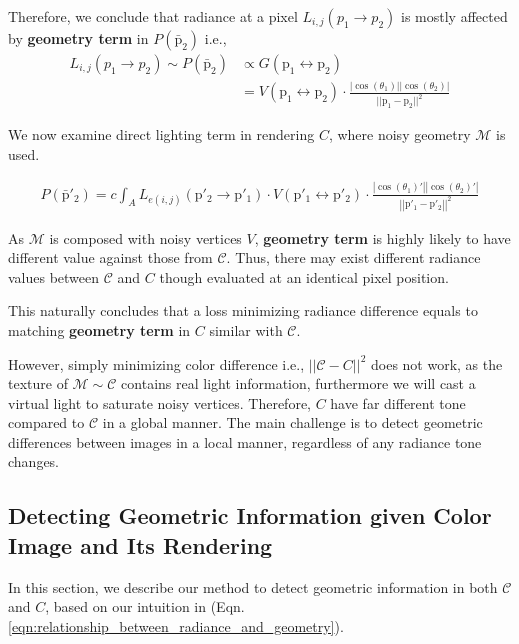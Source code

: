 Therefore, we conclude that radiance at a pixel $L_{i,j}(p_1 \rightarrow p_2)$ is mostly affected by \textbf{geometry term} in $\mathit{P}(\bar{\mathrm{p}}_2)$ i.e., 
\begin{align}
    L_{i,j}(p_1 \rightarrow p_2) \sim \mathit{P}(\bar{\mathrm{p}}_2) & \propto G(\mathrm{p}_1 \leftrightarrow \mathrm{p}_2) \nonumber \\
    & =V(\mathrm{p}_1 \leftrightarrow \mathrm{p}_2) \cdot \frac{|\cos(\theta_1)||\cos(\theta_2)|}{||\mathrm{p}_1-\mathrm{p}_2||^2}
    \label{eqn:relationship_between_radiance_and_geometry}
\end{align}

We now examine direct lighting term in rendering $C$, where noisy geometry $\mathcal{M}$ is used.

\begin{align}
    \mathit{P}\left(\bar{\mathrm{p}}'_2\right) = c\int_A L_{e(i,j)}(\mathrm{p}'_2\rightarrow \mathrm{p}'_1) \cdot V(\mathrm{p}'_1 \leftrightarrow \mathrm{p}'_2) \cdot \frac{\left|\cos(\theta_1)'\right|\left|\cos(\theta_2)'\right|}{\left|\left|\mathrm{p}'_1-\mathrm{p}'_2\right|\right|^2} \nonumber
    \label{LTE_path_integral_direct_lighting_SLAM}
\end{align}

As $\mathcal{M}$ is composed with noisy vertices $V$, \textbf{geometry term} is highly likely to have different value against those from $\mathcal{C}$. 
Thus, there may exist different radiance values between $\mathcal{C}$ and $C$ though evaluated at an identical pixel position.

This naturally concludes that a loss minimizing radiance difference equals to matching \textbf{geometry term} in $C$ similar with $\mathcal{C}$.

However, simply minimizing color difference i.e., $||\mathcal{C}-C||^2$ does not work, as the texture of $\mathcal{M} \sim \mathcal{C}$ contains real light information, furthermore we will cast a virtual light to saturate noisy vertices. 
Therefore, $C$ have far different tone compared to $\mathcal{C}$ in a global manner. 
The main challenge is to detect geometric differences between images in a local manner, regardless of any radiance tone changes.

\subsection{Detecting Geometric Information given Color Image and Its Rendering}
In this section, we describe our method to detect geometric information in both $\mathcal{C}$ and $C$, based on our intuition in (Eqn. \ref{eqn:relationship_between_radiance_and_geometry}).


